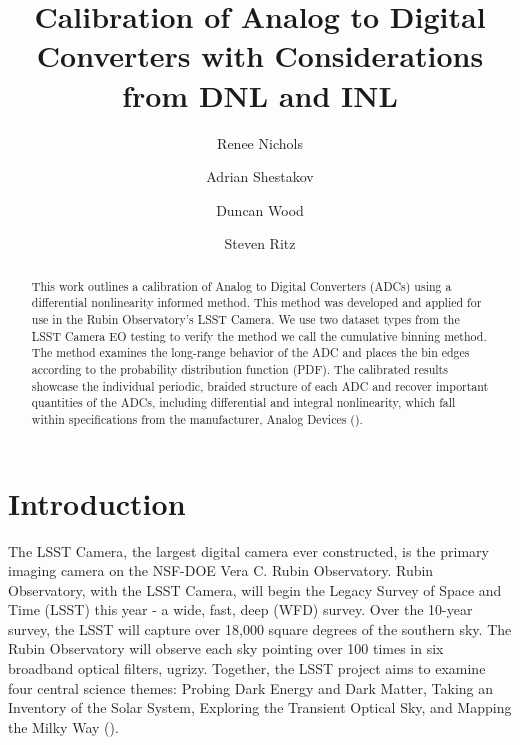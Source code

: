 \documentclass[linenumbers]{aastex7}
\begin{document}
\title{Calibration of Analog to Digital Converters with Considerations from DNL and INL}

\author{Renee Nichols}

\author{Adrian Shestakov}

\author{Duncan Wood}

\author{Steven Ritz}

\begin{abstract}
    This work outlines a calibration of Analog to Digital Converters (ADCs) using a differential nonlinearity informed method.
This method was developed and applied for use in the Rubin Observatory's LSST Camera. 
We use two dataset types from the LSST Camera EO testing to verify the method we call the cumulative binning method. 
The method examines the long-range behavior of the ADC and places the bin edges according to the probability distribution function (PDF). 
The calibrated results showcase the individual periodic, braided structure of each ADC and recover important quantities of the ADCs, including differential and integral nonlinearity, which fall within specifications from the manufacturer, Analog Devices (\cite{AnalogDevices}). 


\end{abstract}


\section{Introduction}
\label{sec: Motivations}


The LSST Camera, the largest digital camera ever constructed, is the primary imaging camera on the NSF-DOE Vera C. Rubin Observatory. 
Rubin Observatory, with the LSST Camera, will begin the Legacy Survey of Space and Time (LSST) this year -  a wide, fast, deep (WFD) survey. 
Over the 10-year survey, the LSST will capture over 18,000 square degrees of the southern sky. 
The Rubin Observatory will observe each sky pointing over 100 times in six broadband optical filters, ugrizy. 
Together, the LSST project aims to examine four central science themes: Probing Dark Energy and Dark Matter, Taking an Inventory of the Solar System, Exploring the Transient Optical Sky, and Mapping the Milky Way (\cite{Ivezic2019}).
\end{document}
